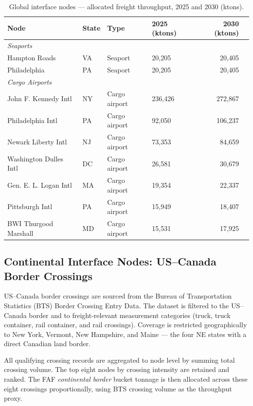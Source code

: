 \begin{table}[htbp]
\centering
\caption{Global interface nodes — allocated freight throughput, 2025 and 2030 (ktons).}
\begin{tabular}{llllrr}
\toprule
Node & State & Type & 2025 (ktons) & 2030 (ktons) \\
\midrule
\multicolumn{5}{l}{\textit{Seaports}} \\
Hampton Roads           & VA & Seaport       & 20{,}205 & 20{,}405 \\
Philadelphia            & PA & Seaport       & 20{,}205 & 20{,}405 \\
\midrule
\multicolumn{5}{l}{\textit{Cargo Airports}} \\
John F. Kennedy Intl    & NY & Cargo airport & 236{,}426 & 272{,}867 \\
Philadelphia Intl       & PA & Cargo airport &  92{,}050 & 106{,}237 \\
Newark Liberty Intl     & NJ & Cargo airport &  73{,}353 &  84{,}659 \\
Washington Dulles Intl  & DC & Cargo airport &  26{,}581 &  30{,}679 \\
Gen. E. L. Logan Intl   & MA & Cargo airport &  19{,}354 &  22{,}337 \\
Pittsburgh Intl         & PA & Cargo airport &  15{,}949 &  18{,}407 \\
BWI Thurgood Marshall   & MD & Cargo airport &  15{,}531 &  17{,}925 \\
\bottomrule
\end{tabular}
\label{tab:task2-global}
\end{table}

\subsection{Continental Interface Nodes: US--Canada Border Crossings}

US--Canada border crossings are sourced from the Bureau of Transportation Statistics
(BTS) Border Crossing Entry Data. The dataset is filtered to the US--Canada border and
to freight-relevant measurement categories (truck, truck container, rail container,
and rail crossings). Coverage is restricted geographically to New York, Vermont,
New Hampshire, and Maine — the four NE states with a direct Canadian land border.

All qualifying crossing records are aggregated to node level by summing total crossing
volume. The top eight nodes by crossing intensity are retained and ranked. The FAF
\textit{continental border} bucket tonnage is then allocated across these eight crossings
proportionally, using BTS crossing volume as the throughput proxy.

